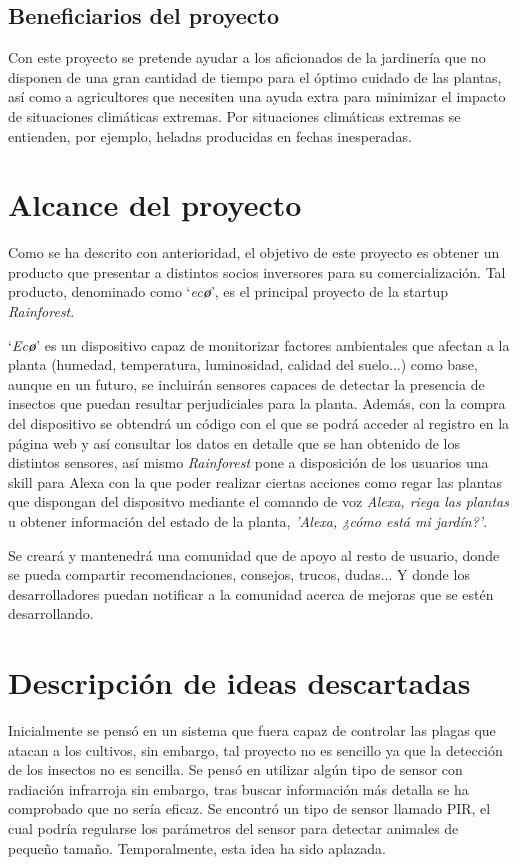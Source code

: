 \documentclass[runningheads]{llncs}
\begin{document}
    
    \subsection{Beneficiarios del proyecto}
    Con este proyecto se pretende ayudar a los aficionados de la
    jardinería que no disponen de una gran cantidad de tiempo para el
    óptimo cuidado de las plantas, así como a agricultores que necesiten
    una ayuda extra para minimizar el impacto de situaciones climáticas
    extremas. Por situaciones climáticas extremas se entienden, por
    ejemplo, heladas producidas en fechas inesperadas.
    
\section{Alcance del proyecto}
Como se ha descrito con anterioridad, el objetivo de este proyecto es
obtener un producto que presentar a distintos socios inversores para su
comercialización. Tal producto, denominado como
`\textit{ec\textbf{\o}}', es  el principal proyecto de la startup
\textit{Rainforest}.

`\textit{Ec\textbf{\o}}' es un dispositivo capaz de monitorizar factores ambientales
que afectan a la planta (humedad, temperatura, luminosidad, calidad del
suelo...) como base, aunque en un futuro, se incluirán sensores capaces
de detectar la presencia de insectos que puedan resultar perjudiciales
para la planta. Además, con la compra del dispositivo se obtendrá un 
código con el que se podrá acceder al registro en la página web y así 
consultar los datos en detalle que se han obtenido de los distintos 
sensores, así mismo \textit{Rainforest} pone a disposición de los usuarios una
skill para Alexa con la que poder realizar ciertas acciones como regar las 
plantas que dispongan del dispositvo mediante el comando de voz \textit{Alexa, 
riega las plantas} u obtener información del estado de la planta, \textit{'Alexa,
¿cómo está mi jardín?'}.  

Se creará  y mantenedrá una comunidad que de apoyo al resto de usuario, 
donde se pueda compartir recomendaciones, consejos, trucos, dudas... Y
donde los desarrolladores puedan notificar a la comunidad acerca de 
mejoras que se estén desarrollando.

\section{Descripción de ideas descartadas}
Inicialmente se pensó en un sistema que fuera capaz de controlar las
plagas que atacan a los cultivos, sin embargo, tal proyecto no es
sencillo ya que la detección de los insectos no es sencilla. Se pensó en
utilizar algún tipo de sensor con radiación infrarroja sin embargo, tras
buscar información más detalla se ha comprobado que no sería eficaz. Se
encontró un tipo de sensor llamado PIR, el cual podría regularse los
parámetros del sensor para detectar animales de pequeño tamaño.
Temporalmente, esta idea ha sido aplazada.
\end{document}

